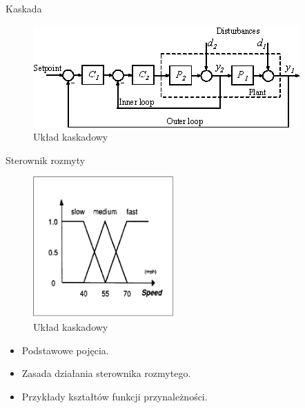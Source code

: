	\begin{frame}{Kaskada}
    	\begin{figure}[!htp]
    		\centering
    		\includegraphics[width=\textwidth]{img/kaskada}
    		\caption{Układ kaskadowy}
    	\end{figure}
	\end{frame}
	
	\begin{frame}[t]{Sterownik rozmyty}
		\only<1>
		{
    		\begin{figure}[!htp]
    			\centering
    			\includegraphics[width=0.48\textwidth]{img/fuzzy}
    			\caption{Układ kaskadowy}
    		\end{figure}\pause
    	}
    	{
    		\begin{itemize}
    			\item Podstawowe pojęcia. 
    			  \pause \pause
    			\item Zasada działania sterownika rozmytego. 
    			  \pause
    			\item Przykłady kształtów funkcji przynależności.
    		\end{itemize}
    	}
	\end{frame}
  
